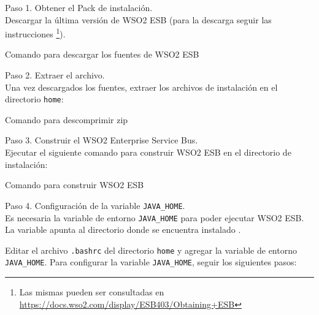 Paso 1. Obtener el Pack de instalación.\\
Descargar la última versión de WSO2 ESB (para la descarga seguir las instrucciones \footnote{Las mismas pueden ser consultadas en \url{https://docs.wso2.com/display/ESB403/Obtaining+ESB}}).

\begin{listing}[H]
  \caption{Comando para descargar los fuentes de WSO2 ESB}
  \label{soa:tecnologias:wso2:bash-descargar-fuentes}
\end{listing}

Paso 2. Extraer el archivo.\\
Una vez descargados los fuentes, extraer los archivos de instalación en el directorio \texttt{home}:

\begin{listing}[H]
  \caption{Comando para descomprimir zip}
  \label{soa:tecnologias:wso2:bash-descomprimir-zip}
\end{listing}

Paso 3. Construir el WSO2 Enterprise Service Bus.\\
Ejecutar el siguiente comando para construir WSO2 ESB en el directorio de instalación:

\begin{listing}[H]
  \caption{Comando para construir WSO2 ESB}
  \label{soa:tecnologias:wso2:bash-maven-clean}
\end{listing}

Paso 4. Configuración de la variable \verb|JAVA_HOME|.\\
Es necesaria la variable de entorno \verb|JAVA_HOME| para poder ejecutar WSO2 ESB.  La variable apunta al directorio donde se encuentra instalado .

Editar el archivo \texttt{.bashrc} del directorio \texttt{home} y agregar la variable de entorno \verb|JAVA_HOME|.  Para configurar la variable \verb|JAVA_HOME|, seguir los siguientes pasos:

